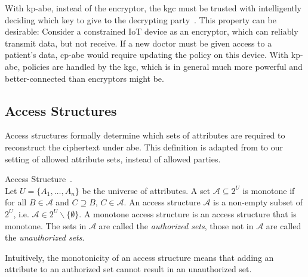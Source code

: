With \acrshort{kp-abe}, instead of the encryptor, the \acrlong{kgc} must be trusted with intelligently deciding which key to give to the decrypting party~\cite{bethencourt_ciphertext-policy_2007}.
This property can be desirable: Consider a constrained IoT device as an encryptor, which can reliably transmit data, but not receive.
If a new doctor must be given access to a patient's data, \acrshort{cp-abe} would require updating the policy on this device.
With \acrshort{kp-abe}, policies are handled by the \acrshort{kgc}, which is in general much more powerful and better-connected than encryptors might be.



\subsection{Access Structures}\label{sec:access-structures}
Access structures formally determine which sets of attributes are required to reconstruct the ciphertext under \acrshort{abe}.
This definition is adapted from \cite{beimel_secure_1996} to our setting of allowed attribute sets, instead of allowed parties.
\begin{definition}Access Structure~\cite{beimel_secure_1996}.\\
    Let $U = \{A_1, \dots, A_n\}$ be the universe of attributes.
    A set $\mathcal{A} \subseteq 2^{U}$ is monotone if for all $B \in \mathcal{A}$ and $C \supseteq B$,  $C \in \mathcal{A}$.
    An access structure $\mathcal{A}$ is a non-empty subset of $2^U$, i.e. $\mathcal{A} \in 2^U \backslash \{\emptyset\}$. A monotone access structure is an access structure that is monotone.
    The sets in $\mathcal{A}$ are called the \emph{authorized sets}, those not in $\mathcal{A}$ are called the \emph{unauthorized sets}.
\end{definition}

Intuitively, the monotonicity of an access structure means that adding an attribute to an authorized set cannot result in an unauthorized set. 

